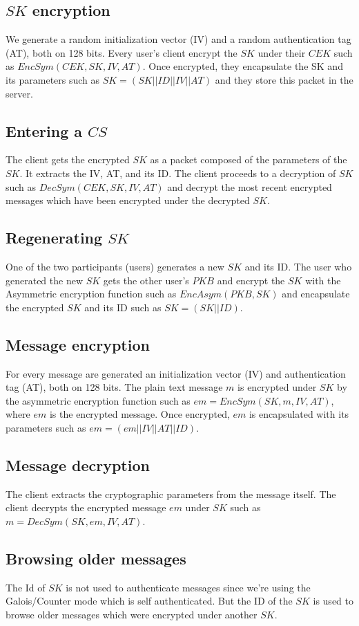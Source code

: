 \documentclass[a4paper,10pt]{article}
\begin{document}
\subsection{$SK$ encryption}
We generate a random initialization vector (IV) and a random authentication tag (AT), both on 128 bits. Every user's client encrypt the $SK$ under their $CEK$ such as $EncSym(CEK, SK, IV,AT)$. Once encrypted, they encapsulate the SK and its parameters such as $SK=(SK||ID||IV||AT)$ and they store this packet in the server.
\subsection{Entering a $CS$}
The client gets the encrypted $SK$ as a packet composed of the parameters of the $SK$. It extracts the IV, AT, and its ID. The client proceeds to a decryption of $SK$ such as $DecSym(CEK, SK, IV, AT)$ and decrypt the most recent encrypted messages which have been encrypted under the decrypted $SK$.
\subsection{Regenerating $SK$}
One of the two participants (users) generates a new $SK$ and its ID. The user who generated the new $SK$ gets the other user's $PKB$ and encrypt the $SK$ with the Asymmetric encryption function such as $EncAsym(PKB, SK)$ and encapsulate the encrypted $SK$ and its ID such as $SK=(SK||ID)$.

\subsection{Message encryption}
For every message are generated an initialization vector (IV) and authentication tag (AT), both on 128 bits. The plain text message $m$ is encrypted under $SK$ by the asymmetric encryption function such as $em=EncSym(SK, m, IV,AT)$, where $em$ is the encrypted message. Once encrypted, $em$ is encapsulated with its parameters such as $em=(em||IV||AT||ID)$.

\subsection{Message decryption}
The client extracts the cryptographic parameters from the message itself. The client decrypts the encrypted message $em$ under $SK$ such as $m=DecSym(SK, em, IV,AT)$.

\subsection{Browsing older messages}
The Id of $SK$ is not used to authenticate messages since we're using the Galois/Counter mode which is self authenticated. But the ID of the $SK$ is used to browse older messages which were encrypted under another $SK$.
\end{document}
